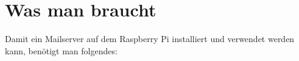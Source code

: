 \section{Was man braucht}
Damit ein Mailserver auf dem Raspberry Pi installiert und verwendet werden kann, benötigt man folgendes: 


